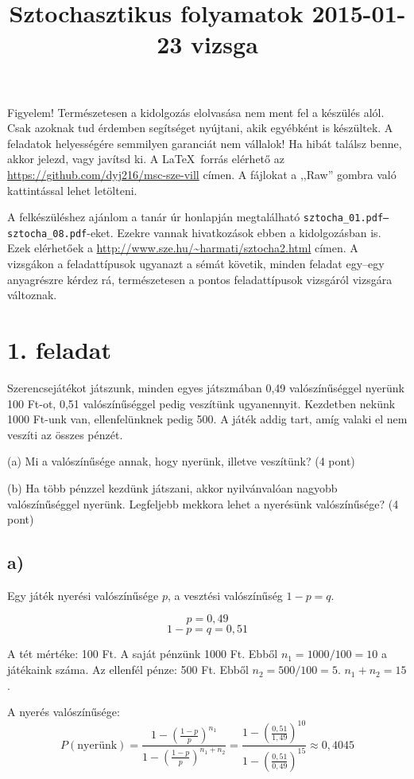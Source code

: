 \documentclass[a4paper,12pt]{article}
\title{Sztochasztikus folyamatok 2015-01-23 vizsga}
\begin{document}
\maketitle

Figyelem! Természetesen a kidolgozás elolvasása nem ment fel a készülés
alól. Csak azoknak tud érdemben segítséget nyújtani, akik egyébként is
készültek. A feladatok helyességére semmilyen garanciát nem vállalok!
Ha hibát találsz benne, akkor jelezd, vagy javítsd ki. A \LaTeX\ forrás
elérhető az \url{https://github.com/dyj216/msc-sze-vill} címen. A
fájlokat a ,,Raw'' gombra való kattintással lehet letölteni.

A felkészüléshez ajánlom a tanár úr honlapján megtalálható 
\texttt{\mbox{sztocha\_01.pdf}--\mbox{sztocha\_08.pdf}}-eket. Ezekre 
vannak hivatkozások ebben a kidolgozásban is. Ezek elérhetőek a 
\url{http://www.sze.hu/~harmati/sztocha2.html} címen. A vizsgákon a 
feladattípusok ugyanazt a sémát követik, minden feladat egy--egy 
anyagrészre kérdez rá, természetesen a pontos feladattípusok vizsgáról
vizsgára változnak.

\section*{1. feladat}
Szerencsejátékot játszunk, minden egyes játszmában 0,49 valószínűséggel
nyerünk 100 Ft-ot, 0,51 valószínűséggel pedig veszítünk ugyanennyit. 
Kezdetben nekünk 1000 Ft-unk van, ellenfelünknek pedig 500. A játék
addig tart, amíg valaki el nem veszíti az összes pénzét.

(a) Mi a valószínűsége annak, hogy nyerünk, illetve veszítünk? (4 pont)

(b) Ha több pénzzel kezdünk játszani, akkor nyilvánvalóan nagyobb 
valószínűséggel nyerünk. Legfeljebb mekkora lehet a nyerésünk
valószínűsége? (4 pont)
\subsection*{a)}
Egy játék nyerési valószínűsége $p$, a vesztési valószínűség $1-p=q$.

\[p = 0,49\]
\[1-p = q = 0,51\]

A tét mértéke: 100 Ft. A saját pénzünk 1000 Ft. Ebből $n_1 = 1000/100=10$ a 
játékaink száma. Az ellenfél pénze: 500 Ft. Ebből $n_2 = 500/100=5$.
$n_1 + n_2 = 15$.

A nyerés valószínűsége:
\[P(\text{nyerünk}) = \frac{1-\left(\frac{1-p}{p}\right)^{n_1}}
{1-\left(\frac{1-p}{p}\right)^{n_1+n_2}} = 
\frac{1-\left(\frac{0,51}{1,49}\right)^{10}}
{1-\left(\frac{0,51}{0,49}\right)^{15}} \approx 0,4045 \]
\end{document}
